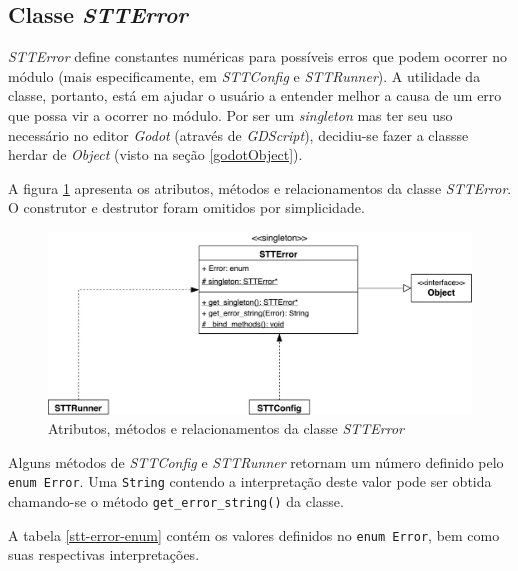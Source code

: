 
\subsection{Classe \textit{STTError}}

\textit{STTError} define constantes numéricas para possíveis erros que podem ocorrer no módulo (mais especificamente, em \textit{STTConfig} e \textit{STTRunner}). A utilidade da classe, portanto, está em ajudar o usuário a entender melhor a causa de um erro que possa vir a ocorrer no módulo. Por ser um \textit{singleton} mas ter seu uso necessário no editor \textit{Godot} (através de \mbox{\textit{GDScript}}), decidiu-se fazer a classse herdar de \textit{Object} (visto na seção \ref{godotObject}).

A figura \ref{stt-error-diagram} apresenta os atributos, métodos e relacionamentos da classe \textit{STTError}. O construtor e destrutor foram omitidos por simplicidade.

\begin{figure}[H]
  \centering
  \includegraphics[width=.9\textwidth]{image/stt-error.pdf}
  \caption{Atributos, métodos e relacionamentos da classe \textit{STTError}}
  \label{stt-error-diagram}
\end{figure}

Alguns métodos de \textit{STTConfig} e \textit{STTRunner} retornam um número definido pelo \texttt{enum Error}. Uma \texttt{String} contendo a interpretação deste valor pode ser obtida chamando-se o método \texttt{get\_error\_string()} da classe.

A tabela \ref{stt-error-enum} contém os valores definidos no \texttt{enum Error}, bem como suas respectivas interpretações.

